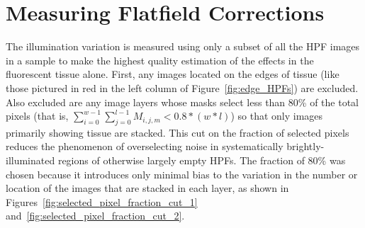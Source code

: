 \documentclass[letterpaper,11pt]{article}
\newcommand{\reffig}[1]{Figure~\ref{#1}}
\begin{document}
\section{Measuring Flatfield Corrections}
\label{sec:measuring_flatfield_corrections}

The illumination variation is measured using only a subset of all the HPF images in a sample to make the highest quality estimation of the effects in the fluorescent tissue alone. First, any images located on the edges of tissue (like those pictured in red in the left column of \reffig{fig:edge_HPFs}) are excluded. Also excluded are any image layers whose masks select less than 80\% of the total pixels (that is, $\sum_{i=0}^{w-1}\sum_{j=0}^{l-1}M_{i,j,m}<0.8*(w*l)$) so that only images primarily showing tissue are stacked. This cut on the fraction of selected pixels reduces the phenomenon of overselecting noise in systematically brightly-illuminated regions of otherwise largely empty HPFs. The fraction of 80\% was chosen because it introduces only minimal bias to the variation in the number or location of the images that are stacked in each layer, as shown in Figures~\ref{fig:selected_pixel_fraction_cut_1} and~\ref{fig:selected_pixel_fraction_cut_2}.
\end{document}
